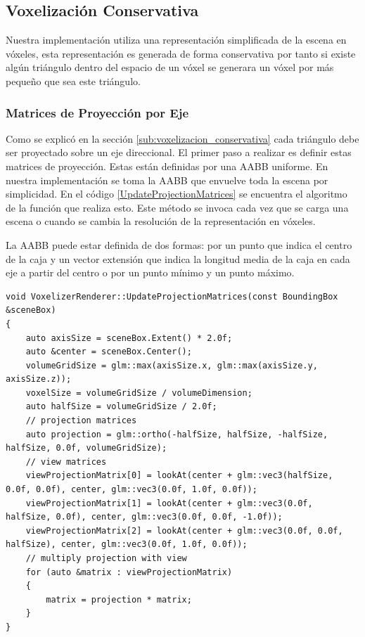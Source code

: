 \subsection{Voxelización Conservativa} %
\label{sub:voxelization_impl}
Nuestra implementación utiliza una representación simplificada de la escena en vóxeles, esta representación es generada de forma conservativa por tanto si existe algún triángulo dentro del espacio de un vóxel se generara un vóxel por más pequeño que sea este triángulo.
 
\subsubsection{Matrices de Proyección por Eje}

Como se explicó en la sección \ref{sub:voxelizacion_conservativa} cada triángulo debe ser proyectado sobre un eje direccional. El primer paso a realizar es definir estas matrices de proyección. Estas están definidas por una \ac{AABB} uniforme. En nuestra implementación se toma la \ac{AABB} que envuelve toda la escena por simplicidad. En el código \ref{UpdateProjectionMatrices} se encuentra el algoritmo de la función que realiza esto. Este método se invoca cada vez que se carga una escena o cuando se cambia la resolución de la representación en vóxeles.

La \ac{AABB} puede estar definida de dos formas: por un punto que indica el centro de la caja y un vector extensión que indica la longitud media de la caja en cada eje a partir del centro o por un punto mínimo y un punto máximo. 
\\
\begin{lstlisting}[caption={Creación de matrices de proyección ortogonal por cada eje direccional}, label=UpdateProjectionMatrices]
void VoxelizerRenderer::UpdateProjectionMatrices(const BoundingBox &sceneBox)
{
    auto axisSize = sceneBox.Extent() * 2.0f;
    auto &center = sceneBox.Center();
    volumeGridSize = glm::max(axisSize.x, glm::max(axisSize.y, axisSize.z));
    voxelSize = volumeGridSize / volumeDimension;
    auto halfSize = volumeGridSize / 2.0f;
    // projection matrices
    auto projection = glm::ortho(-halfSize, halfSize, -halfSize, halfSize, 0.0f, volumeGridSize);
    // view matrices
    viewProjectionMatrix[0] = lookAt(center + glm::vec3(halfSize, 0.0f, 0.0f), center, glm::vec3(0.0f, 1.0f, 0.0f));
    viewProjectionMatrix[1] = lookAt(center + glm::vec3(0.0f, halfSize, 0.0f), center, glm::vec3(0.0f, 0.0f, -1.0f));
    viewProjectionMatrix[2] = lookAt(center + glm::vec3(0.0f, 0.0f, halfSize), center, glm::vec3(0.0f, 1.0f, 0.0f));
    // multiply projection with view
    for (auto &matrix : viewProjectionMatrix)
    {
        matrix = projection * matrix;
    }
}
\end{lstlisting}

